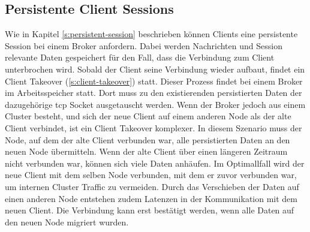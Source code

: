 \subsection{Persistente Client Sessions} \label{sp:persistent-session}
Wie in Kapitel \ref{s:persistent-session} beschrieben können Clients eine persistente Session bei einem Broker anfordern. Dabei werden Nachrichten und Session relevante Daten gespeichert für den Fall, dass die Verbindung zum Client unterbrochen wird. Sobald der Client seine Verbindung wieder aufbaut, findet ein Client Takeover (\ref{s:client-takeover}) statt.
Dieser Prozess findet bei einem Broker im Arbeitsspeicher statt.
Dort muss zu den existierenden persistierten Daten der dazugehörige \ac{tcp} Socket ausgetauscht werden.
Wenn der Broker jedoch aus einem Cluster besteht, und sich der neue Client auf einem anderen Node als der alte Client verbindet, ist ein Client Takeover komplexer.
In diesem Szenario muss der Node, auf dem der alte Client verbunden war, alle persistierten Daten an den neuen Node übermitteln.
Wenn der alte Client über einen längeren Zeitraum nicht verbunden war, können sich viele Daten anhäufen.
Im Optimallfall wird der neue Client mit dem selben Node verbunden, mit dem er zuvor verbunden war, um internen Cluster Traffic zu vermeiden. Durch das Verschieben der Daten auf einen anderen Node entstehen zudem Latenzen in der Kommunikation mit dem neuen Client. Die Verbindung kann erst bestätigt werden, wenn alle Daten auf den neuen Node migriert wurden.
\begin{comment}
Um einen Client immer zum selben Node zu verbinden werden bei anderen Protokollen wie \ac{http} zum Beispiel Cookies verwendet. Die Cookies werden von dem Load Balancer ausgelesen und enthalten Informationen zu welchem Node der Client als letztes verbunden war. Das \ac{mqtt} Protokoll unterstützt keinen Mechanismus, der wie \ac{http} Cookies funktioniert.
Eine weitere Option einen Client immer zum selben Node zu verbinden ist consistent hashing, wie in Kapitel \ref{sb:lb-algo} beschrieben. Dabei werden Layer vier Informationen des Clients ausgelesen, wie zum Beispiel die \ac{ip} Adresse, und gehasht. Anhand des Hashes wird anschlie{\ss}end der Node bestimmt, zu welchem der Client verbunden wird. Solange sich keine der gehashten Informationen ändert, wird der Client immer an den selben Node weitergeleitet.
Je nach Anwendungsfall verbinden sich \ac{mqtt} Clients auch über das Mobilfunknetz. Durch den ständigen Standortwechsel wird zwangsweise ebenfalls der Mobilfunkmast gewechselt. Es wird nicht garantiert, dass der LKW immer die selbe \ac{ip} behält. \verb|MAGLEV| würde somit bei einem Verbindungsabbruch den Client an einen neuen Node weiterleiten.
\end{comment}

